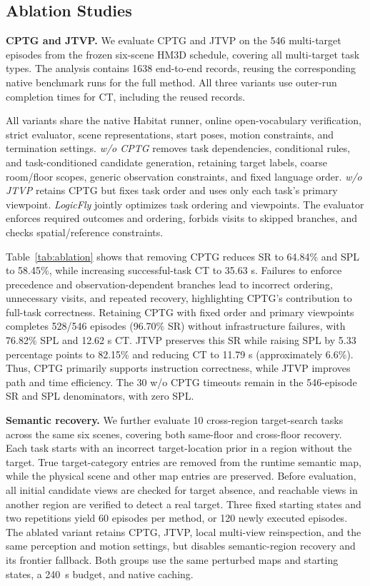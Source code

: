 \documentclass[letterpaper,10pt,journal]{IEEEtran}
\begin{document}
\subsection{Ablation Studies}


\textbf{CPTG and JTVP.}
We evaluate CPTG and JTVP on the 546 multi-target episodes from the frozen six-scene HM3D schedule, covering all multi-target task types. The analysis contains 1638 end-to-end records, reusing the corresponding native benchmark runs for the full method. All three variants use outer-run completion times for CT, including the reused records.

All variants share the native Habitat runner, online open-vocabulary verification, strict evaluator, scene representations, start poses, motion constraints, and termination settings. \emph{w/o CPTG} removes task dependencies, conditional rules, and task-conditioned candidate generation, retaining target labels, coarse room/floor scopes, generic observation constraints, and fixed language order. \emph{w/o JTVP} retains CPTG but fixes task order and uses only each task's primary viewpoint. \emph{LogicFly} jointly optimizes task ordering and viewpoints. The evaluator enforces required outcomes and ordering, forbids visits to skipped branches, and checks spatial/reference constraints.







Table~\ref{tab:ablation} shows that removing CPTG reduces SR to 64.84\% and SPL to 58.45\%, while increasing successful-task CT to 35.63 s. Failures to enforce precedence and observation-dependent branches lead to incorrect ordering, unnecessary visits, and repeated recovery, highlighting CPTG's contribution to full-task correctness. Retaining CPTG with fixed order and primary viewpoints completes 528/546 episodes (96.70\% SR) without infrastructure failures, with 76.82\% SPL and 12.62 s CT. JTVP preserves this SR while raising SPL by 5.33 percentage points to 82.15\% and reducing CT to 11.79 s (approximately 6.6\%). Thus, CPTG primarily supports instruction correctness, while JTVP improves path and time efficiency. The 30 w/o CPTG timeouts remain in the 546-episode SR and SPL denominators, with zero SPL.

\textbf{Semantic recovery.}
We further evaluate 10 cross-region target-search tasks across the same six scenes, covering both same-floor and cross-floor recovery. Each task starts with an incorrect target-location prior in a region without the target. True target-category entries are removed from the runtime semantic map, while the physical scene and other map entries are preserved. Before evaluation, all initial candidate views are checked for target absence, and reachable views in another region are verified to detect a real target. Three fixed starting states and two repetitions yield 60 episodes per method, or 120 newly executed episodes. The ablated variant retains CPTG, JTVP, local multi-view reinspection, and the same perception and motion settings, but disables semantic-region recovery and its frontier fallback. Both groups use the same perturbed maps and starting states, a 240~s budget, and native caching.
\end{document}
